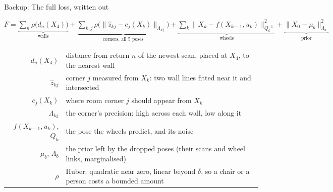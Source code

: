 \documentclass[10pt, aspectratio=169]{beamer}
\begin{document}
\begin{frame}{Backup: The full loss, written out}
  \centering
  \vspace{0pt plus 1filll}
  {\small
  $F = \underbrace{\textstyle\sum_n \rho\big(d_n(X_4)\big)}_{\text{walls}}
   + \underbrace{\textstyle\sum_{k,j} \rho\big(\lVert \hat z_{kj} - c_j(X_k)\rVert_{\Lambda_{kj}}\big)}_{\text{corners, all 5 poses}}
   + \underbrace{\textstyle\sum_k \lVert X_k - f(X_{k-1}, u_k)\rVert^2_{Q_k^{-1}}}_{\text{wheels}}
   + \underbrace{\lVert X_0 - \mu_b\rVert^2_{\Lambda_b}}_{\text{prior}}$\par}
  \vspace{1em}
  {\footnotesize
  \renewcommand{\arraystretch}{1.3}
  \begin{tabular}{@{}r@{\quad}l@{}}
    $d_n(X_4)$ & distance from return $n$ of the newest scan, placed at $X_4$, to the nearest wall \\
    $\hat z_{kj}$ & corner $j$ measured from $X_k$: two wall lines fitted near it and intersected \\
    $c_j(X_k)$ & where room corner $j$ should appear from $X_k$ \\
    $\Lambda_{kj}$ & the corner's precision: high across each wall, low along it \\
    $f(X_{k-1}, u_k)$, $Q_k$ & the pose the wheels predict, and its noise \\
    $\mu_b$, $\Lambda_b$ & the prior left by the dropped poses (their scans and wheel links, marginalised) \\
    $\rho$ & Huber: quadratic near zero, linear beyond $\delta$, so a chair or a person costs a bounded amount \\
  \end{tabular}\par}
  \vspace{0pt plus 1filll}
\end{frame}
\end{document}
